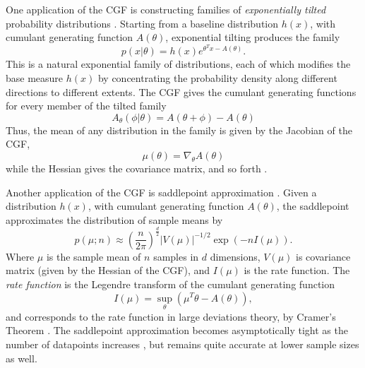 \documentclass{article}      %
\begin{document}
One application of the CGF is constructing families of \textit{exponentially tilted} probability distributions \cite{morris_natural_1982,morris_unifying_2009}.
Starting from a baseline distribution $h(x)$, with cumulant generating function $A(\theta)$, exponential tilting produces the family
\begin{equation}
  p(x | \theta) = h(x) e^{\theta^T x - A(\theta)}. \label{def:exponential_tilt}
\end{equation}
This is a natural exponential family of distributions, each of which modifies the base measure $h(x)$ by concentrating the probability density along different directions to different extents.
The CGF gives the cumulant generating functions for every member of the tilted family
\begin{equation}
  A_\theta(\phi | \theta) = A(\theta + \phi) - A(\theta) \label{eq:CGF_family}
\end{equation}
Thus, the mean of any distribution in the family is given by the Jacobian of the CGF,
\begin{equation}
  \mu(\theta) = \nabla_\theta A(\theta) \label{eq:cgf_jacobian}
\end{equation}
while the Hessian gives the covariance matrix, and so forth \cite{barndorff2014information}.

Another application of the CGF is saddlepoint approximation \cite{daniels_saddlepoint_1954,barndorff-nielsen_edgeworth_1979}.
Given a distribution $h(x)$, with cumulant generating function $A(\theta)$, the saddlepoint approximates the distribution of sample means by
\begin{equation}
  p(\mu; n) \approx \left( \frac{n}{2\pi} \right)^{\frac{d}{2}} |V(\mu)|^{-1/2} \exp(-n I(\mu)). \label{def:mean_density}
\end{equation}
Where $\mu$ is the sample mean of $n$ samples in $d$ dimensions, $V(\mu)$ is covariance matrix (given by the Hessian of the CGF), and $I(\mu)$ is the rate function.
The \textit{rate function} is the Legendre transform of the cumulant generating function
\begin{equation}
  I(\mu) = \sup_{\theta}(\mu^T \theta  - A(\theta) ), \label{eq:legendre_transform}
\end{equation}
and corresponds to the rate function in large deviations theory, by Cramer's Theorem \cite{dembo2009large}.
The saddlepoint approximation becomes asymptotically tight as the number of datapoints increases \cite{iltis_sharp_1995,chaganty_multidimensional_1986}, but remains quite accurate at lower sample sizes \cite{davison_saddlepoint_1988,ronchetti_empirical_1994} as well.
\end{document}

